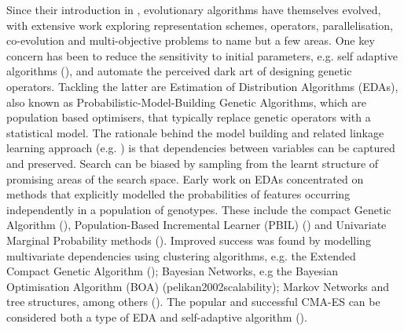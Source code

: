 \documentclass[twoside]{article}
\begin{document}
Since their introduction in \cite{holland1975adaptation}, evolutionary algorithms have themselves evolved, with extensive work exploring representation schemes, operators, parallelisation, co-evolution and multi-objective problems to name but a few areas. One key concern has been to reduce the sensitivity to initial parameters, e.g. self adaptive algorithms (\cite{back1993overview}), and automate the perceived dark art of designing genetic operators. Tackling the latter are Estimation of Distribution Algorithms (EDAs), also known as Probabilistic-Model-Building Genetic Algorithms, which are population based optimisers, that typically replace genetic operators with a statistical model. The rationale behind the model building and related linkage learning approach (e.g. \cite{thierens2010linkage,harik1999linkage}) is that dependencies between variables can be captured and preserved. Search can be biased by sampling from the learnt structure of promising areas of the search space. Early work on EDAs concentrated on methods that explicitly modelled the probabilities of features occurring independently in a population of genotypes. These include the compact Genetic Algorithm (\cite{harik1999compact}), Population-Based Incremental Learner (PBIL) (\cite{baluja1994population}) and Univariate Marginal Probability methods (\cite{pelikan2002survey}). Improved success was found by modelling multivariate dependencies using clustering algorithms, e.g. the Extended Compact Genetic Algorithm (\cite{harik1999linkage}); Bayesian Networks, e.g the Bayesian Optimisation Algorithm (BOA) (pelikan2002scalability); Markov Networks and tree structures, among others (\cite{pelikan2002survey}). The popular and successful CMA-ES can be considered both a type of EDA and self-adaptive algorithm (\cite{hansen2003reducing}).
\end{document}
